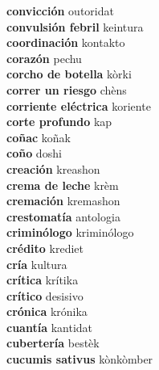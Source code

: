 \textbf{ convicción  } outoridat \\
\textbf{ convulsión febril  } keintura \\
\textbf{ coordinación  } kontakto \\
\textbf{ corazón  } pechu \\
\textbf{ corcho de botella  } kòrki \\
\textbf{ correr un riesgo  } chèns \\
\textbf{ corriente eléctrica  } koriente \\
\textbf{ corte profundo  } kap \\
\textbf{ coñac  } koñak \\
\textbf{ coño  } doshi \\
\textbf{ creación  } kreashon \\
\textbf{ crema de leche  } krèm \\
\textbf{ cremación  } kremashon \\
\textbf{ crestomatía  } antologia \\
\textbf{ criminólogo  } kriminólogo \\
\textbf{ crédito  } krediet \\
\textbf{ cría  } kultura \\
\textbf{ crítica  } krítika \\
\textbf{ crítico  } desisivo \\
\textbf{ crónica  } krónika \\
\textbf{ cuantía  } kantidat \\
\textbf{ cubertería  } bestèk \\
\textbf{ cucumis sativus  } kònkòmber \\
